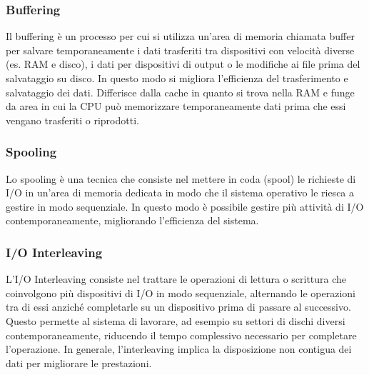 \documentclass[a4paper]{article}
\begin{document}
\subsubsection*{Buffering}
Il buffering è un processo per cui si utilizza un’area di memoria chiamata buffer per salvare temporaneamente i dati trasferiti
tra dispositivi con velocità diverse (es. RAM e disco), i dati per dispositivi di output o le modifiche ai file prima del
salvataggio su disco. In questo modo si migliora l’efficienza del trasferimento e salvataggio dei dati. Differisce dalla cache
in quanto si trova nella RAM e funge da area in cui la CPU può memorizzare temporaneamente dati prima che essi vengano trasferiti
o riprodotti.

\subsubsection*{Spooling}
Lo spooling è una tecnica che consiste nel mettere in coda (spool) le richieste di I/O in un'area di memoria dedicata in modo
che il sistema operativo le riesca a gestire in modo sequenziale. In questo modo è possibile gestire più attività di I/O
contemporaneamente, migliorando l'efficienza del sistema.

\subsubsection*{I/O Interleaving}
L'I/O Interleaving consiste nel trattare le operazioni di lettura o scrittura che coinvolgono più dispositivi di I/O in modo
sequenziale, alternando le operazioni tra di essi anziché completarle su un dispositivo prima di passare al successivo. Questo
permette al sistema di lavorare, ad esempio su settori di dischi diversi contemporaneamente, riducendo il tempo complessivo
necessario per completare l’operazione. In generale, l’interleaving implica la disposizione non contigua dei dati per migliorare
le prestazioni.
\end{document}
